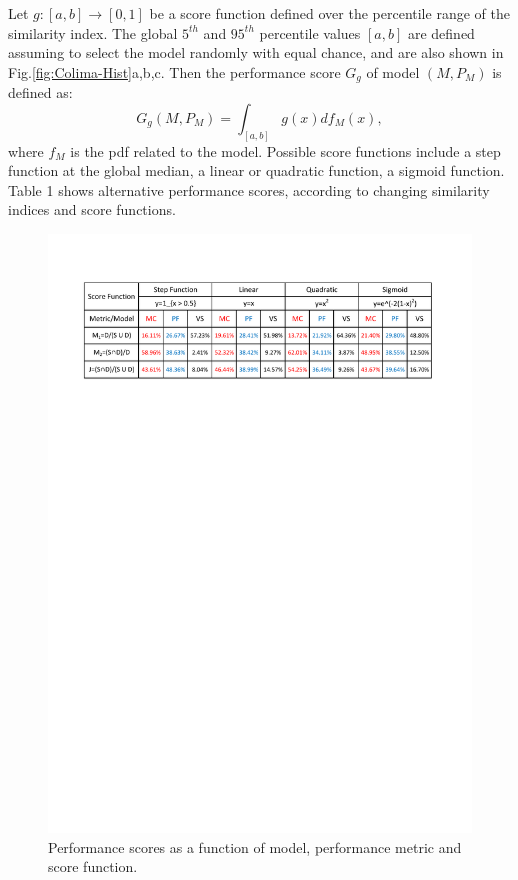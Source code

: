 \documentclass{article}
\begin{document}
Let $g:[a,b]\rightarrow[0,1]$ be a score function defined over the percentile range of the similarity index. The global $5^{th}$ and $95^{th}$ percentile values $[a,b]$ are defined assuming to select the model randomly with equal chance, and are also shown in Fig.\ref{fig:Colima-Hist}a,b,c. Then the performance score $G_g$ of model $\left(M, P_M\right)$ is defined as:
$$G_g\left(M, P_M\right)=\int_{[a,b]} g(x) df_M(x),$$
where $f_M$ is the pdf related to the model. Possible score functions include a step function at the global median, a linear or quadratic function, a sigmoid function. Table 1 shows alternative performance scores, according to changing similarity indices and score functions.

\begin{figure}[H]
         \centering
        \includegraphics[width=1\textwidth]{figures/Colima/SuppInfo_table.pdf}
        \caption{Performance scores as a function of model, performance metric and score function.}
\end{figure}
\end{document}
